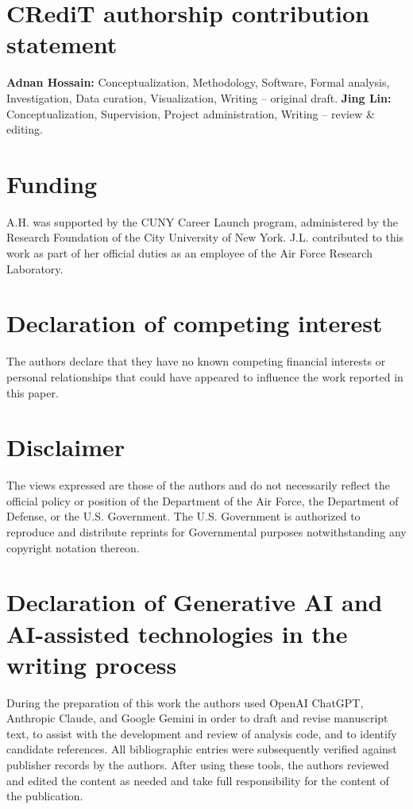 \documentclass[preprint,12pt]{elsarticle}
\begin{document}
\section*{CRediT authorship contribution statement}
\textbf{Adnan Hossain:} Conceptualization, Methodology, Software, Formal analysis, Investigation, Data curation, Visualization, Writing -- original draft.
\textbf{Jing Lin:} Conceptualization, Supervision, Project administration,
Writing -- review \& editing.
 
\section*{Funding}
A.H. was supported by the CUNY Career Launch program, administered by the Research Foundation of the City University of New York. J.L. contributed to this work as part of her official duties as an employee of the Air Force Research Laboratory.
 
\section*{Declaration of competing interest}
The authors declare that they have no known competing financial interests or personal relationships that could have appeared to influence the work reported in this paper.
 
\section*{Disclaimer}
The views expressed are those of the authors and do not necessarily reflect the official policy or position of the Department of the Air Force, the Department of Defense, or the U.S. Government. The U.S. Government is authorized to reproduce and distribute reprints for Governmental purposes notwithstanding any copyright notation thereon.

\section*{Declaration of Generative AI and AI-assisted technologies in the writing process} During the preparation of this work the authors used OpenAI ChatGPT, Anthropic Claude, and Google Gemini in order to draft and revise manuscript text, to assist with the development and review of analysis code, and to identify candidate references. All bibliographic entries were subsequently verified against publisher records by the authors. After using these tools, the authors reviewed and edited the content as needed and take full responsibility for the content of the publication.



\end{document}
